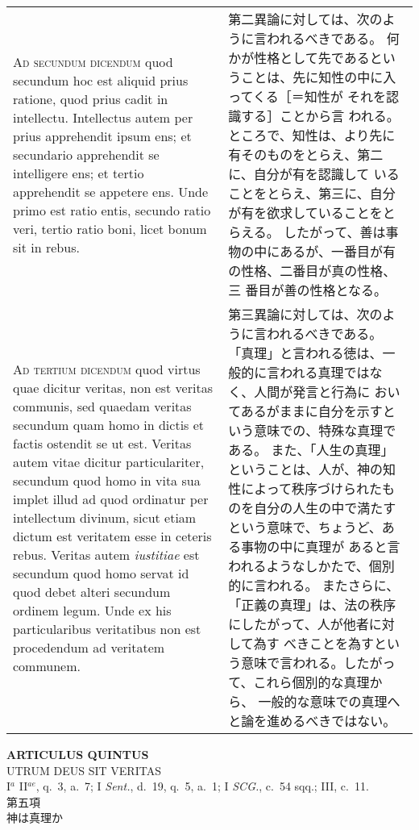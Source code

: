 \documentclass[10pt]{jsarticle} %
\begin{document}
\begin{longtable}{p{21em}p{21em}}
\\


{\scshape Ad secundum dicendum} quod secundum hoc est
aliquid prius ratione, quod prius cadit in intellectu. Intellectus autem
per prius apprehendit ipsum ens; et secundario apprehendit se
intelligere ens; et tertio apprehendit se appetere ens. Unde primo est
ratio entis, secundo ratio veri, tertio ratio boni, licet bonum sit in
rebus.

&

第二異論に対しては、次のように言われるべきである。
何かが性格として先であるということは、先に知性の中に入ってくる［＝知性が
 それを認識する］ことから言
 われる。
ところで、知性は、より先に有そのものをとらえ、第二に、自分が有を認識して
 いることをとらえ、第三に、自分が有を欲求していることをとらえる。
したがって、善は事物の中にあるが、一番目が有の性格、二番目が真の性格、三
 番目が善の性格となる。

\\


{\scshape Ad tertium dicendum} quod virtus quae dicitur veritas, non est
veritas communis, sed quaedam veritas secundum quam homo in dictis et
factis ostendit se ut est. Veritas autem vitae dicitur particulariter,
secundum quod homo in vita sua implet illud ad quod ordinatur per
intellectum divinum, sicut etiam dictum est veritatem esse in ceteris
rebus. Veritas autem {\itshape iustitiae} est secundum quod homo servat
id quod debet alteri secundum ordinem legum. Unde ex his particularibus
veritatibus non est procedendum ad veritatem communem.

&

第三異論に対しては、次のように言われるべきである。
「真理」と言われる徳は、一般的に言われる真理ではなく、人間が発言と行為に
 おいてあるがままに自分を示すという意味での、特殊な真理である。
また、「人生の真理」ということは、人が、神の知性によって秩序づけられたも
 のを自分の人生の中で満たすという意味で、ちょうど、ある事物の中に真理が
 あると言われるようなしかたで、個別的に言われる。
またさらに、「正義の真理」は、法の秩序にしたがって、人が他者に対して為す
 べきことを為すという意味で言われる。したがって、これら個別的な真理から、
 一般的な意味での真理へと論を進めるべきではない。


\end{longtable}
\newpage


\begin{center}
 {\Large {\bf ARTICULUS QUINTUS}}\\
 {\large UTRUM DEUS SIT VERITAS}\\
 {\footnotesize I$^a$ II$^{ae}$, q.~3, a.~7; I {\itshape Sent.}, d.~19,
 q.~5, a.~1; I {\itshape SCG.}, c.~54 sqq.; III, c.~11.}\\
 {\Large 第五項\\神は真理か}
\end{center}
\end{document}
